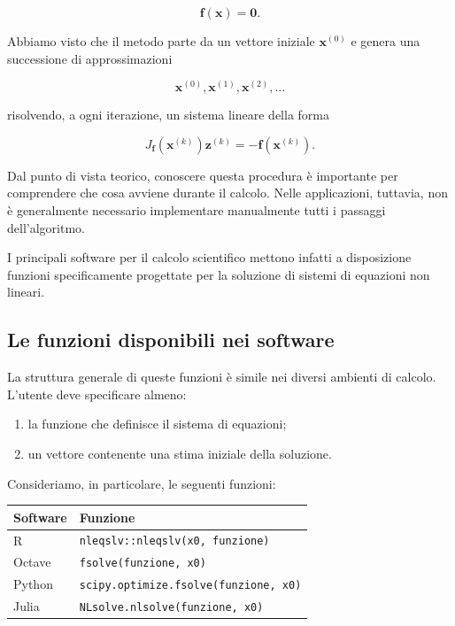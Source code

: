 \begin{equation*}
    \mathbf{f}(\mathbf{x})=\mathbf{0}.
\end{equation*}

Abbiamo visto che il metodo parte da un vettore iniziale
$\mathbf{x}^{(0)}$ e genera una successione di approssimazioni

\begin{equation*}
    \mathbf{x}^{(0)},
    \mathbf{x}^{(1)},
    \mathbf{x}^{(2)},
    \ldots
\end{equation*}

risolvendo, a ogni iterazione, un sistema lineare della forma

\begin{equation*}
    J_{\mathbf{f}}(\mathbf{x}^{(k)})
    \mathbf{z}^{(k)}
    =
    -\mathbf{f}(\mathbf{x}^{(k)}).
\end{equation*}

Dal punto di vista teorico, conoscere questa procedura è importante
per comprendere che cosa avviene durante il calcolo. Nelle
applicazioni, tuttavia, non è generalmente necessario implementare
manualmente tutti i passaggi dell'algoritmo.

I principali software per il calcolo scientifico mettono infatti a
disposizione funzioni specificamente progettate per la soluzione di
sistemi di equazioni non lineari.


\subsection{Le funzioni disponibili nei software}

La struttura generale di queste funzioni è simile nei diversi
ambienti di calcolo. L'utente deve specificare almeno:

\begin{enumerate}
    \item la funzione che definisce il sistema di equazioni;
    \item un vettore contenente una stima iniziale della soluzione.
\end{enumerate}

Consideriamo, in particolare, le seguenti
funzioni:

\begin{center}
\begin{tabular}{ll}
\hline
Software & Funzione\\
\hline
R      & \texttt{nleqslv::nleqslv(x0, funzione)}\\
Octave & \texttt{fsolve(funzione, x0)}\\
Python & \texttt{scipy.optimize.fsolve(funzione, x0)}\\
Julia  & \texttt{NLsolve.nlsolve(funzione, x0)}\\
\hline
\end{tabular}
\end{center}

